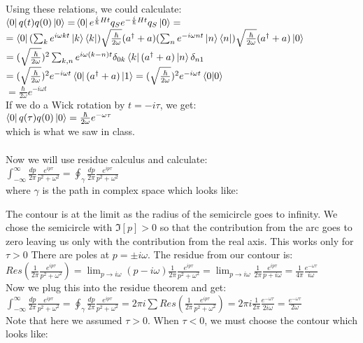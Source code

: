 \documentclass{article}
\begin{document}
Using these relations, we could calculate:\\
$\bra{0}q(t)q(0)\ket{0}=$$\bra{0}e^{\frac{i}{\hbar} H t}q_Se^{-\frac{i}{\hbar}Ht}q_S\ket{0}=$\\
$=\bra{0}(\sum_{k}e^{i\omega kt}\ket{k}\bra{k})\sqrt{\frac{\hbar}{2\omega}}(a^\dagger + a)(\sum_{n}e^{-i\omega nt}\ket{n}\bra{n})\sqrt{\frac{\hbar}{2\omega}}(a^\dagger + a)\ket{0}$\\
$=(\sqrt{\frac{\hbar}{2\omega}})^2\sum_{k,n}e^{i\omega (k-n)t}\delta_{0 k}\bra{k}(a^\dagger + a)\ket{n}\delta_{n 1} $\\
$=(\sqrt{\frac{\hbar}{2\omega}})^2e^{-i\omega t}\bra{0}(a^\dagger + a)\ket{1}=(\sqrt{\frac{\hbar}{2\omega}})^2e^{-i\omega t}\braket{0}$\\
$=\boxed{\frac{\hbar}{2\omega}e^{-i\omega t}}$\\
If we do a Wick rotation by $t=-i\tau$, we get:\\
$\bra{0}q(\tau)q(0)\ket{0}=\frac{\hbar}{2\omega}e^{-\omega \tau}$\\
which is what we saw in class.\\\\
Now we will use residue calculus and calculate:\\
$\int_{-\infty}^{\infty}\frac{dp}{2\pi}\frac{e^{ip\tau}}{p^2+\omega^2}=\oint_\gamma\frac{dp}{2\pi}\frac{e^{ip\tau}}{p^2+\omega^2}$\\
where $\gamma$ is the path in complex space which looks like:\\

The contour is at the limit as the radius of the semicircle goes to infinity. We chose the semicircle with $\Im[p]>0$ so that the contribution from the arc goes to zero leaving us only with the contribution from the real axis. This works only for $\tau > 0$ There are poles at $p=\pm i\omega$. The residue from our contour is:\\
$Res(\frac{1}{2\pi}\frac{e^{ip\tau}}{p^2+\omega^2})= \lim_{p\rightarrow i\omega}(p-i\omega)\frac{1}{2\pi}\frac{e^{ip\tau}}{p^2+\omega^2}=$$\lim_{p\rightarrow i\omega}\frac{1}{2\pi}\frac{e^{ip\tau}}{p+i\omega}=$$\frac{1}{4\pi}\frac{e^{-\omega\tau}}{i\omega}$\\
Now we plug this into the residue theorem and get:\\
$\int_{-\infty}^{\infty}\frac{dp}{2\pi}\frac{e^{ip\tau}}{p^2+\omega^2}=\oint_\gamma\frac{dp}{2\pi}\frac{e^{ip\tau}}{p^2+\omega^2}=2\pi i\sum Res(\frac{1}{2\pi}\frac{e^{ip\tau}}{p^2+\omega^2})=2 \pi i \frac{1}{2\pi}\frac{e^{-\omega\tau}}{2i\omega}=\frac{e^{-\omega\tau}}{2\omega}$\\
Note that here we assumed $\tau > 0$. When $\tau < 0$, we must choose the contour which looks like: 
\end{document}

